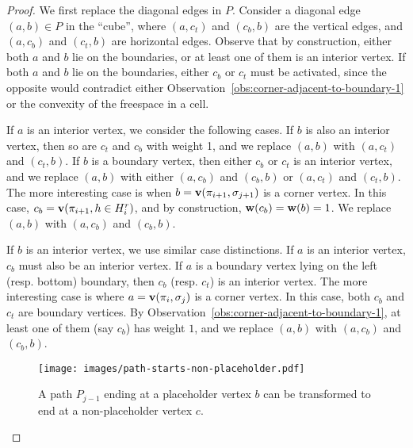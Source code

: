 \documentclass[thm-restate]{lipics-v2021}
\theoremstyle{remark}
\newcommand{\weight}[1]{\normalfont \textbf{w}(#1)}
\newcommand{\doublequote}[1]{``#1''}
\newcommand{\vertex}[1]{\normalfont \textbf{v}(#1)}
\begin{document}
\begin{proof}
    We first replace the diagonal edges in $P$. Consider a diagonal edge $(a, b) \in P$ in the \doublequote{cube}, where $(a, c_t)$ and $(c_b, b)$ are the vertical edges, and $(a, c_b)$ and $(c_t, b)$ are horizontal edges. Observe that by construction, either both $a$ and $b$ lie on the boundaries, or at least one of them is an interior vertex. If both $a$ and $b$ lie on the boundaries, either $c_b$ or $c_t$ must be activated, since the opposite would contradict either Observation~\ref{obs:corner-adjacent-to-boundary-1} or the convexity of the freespace in a cell. 
    
    If $a$ is an interior vertex, we consider the following cases. If $b$ is also an interior vertex, then so are $c_t$ and $c_b$ with weight 1, and we replace $(a, b)$ with $(a, c_t)$ and $(c_t, b)$. If $b$ is a boundary vertex, then either $c_b$ or $c_t$ is an interior vertex, and we replace $(a, b)$ with either $(a, c_b)$ and $(c_b, b)$ or $(a, c_t)$ and $(c_t, b)$. The more interesting case is when $b = \vertex{\pi_{i + 1}, \sigma_{j + 1}}$ is a corner vertex. In this case, $c_b = \vertex{\pi_{i + 1}, h \in H^r_i}$, and by construction, $\weight{c_b} = \weight{b} = 1$. We replace $(a, b)$ with $(a, c_b)$ and $(c_b, b)$. 

    If $b$ is an interior vertex, we use similar case distinctions. If $a$ is an interior vertex, $c_b$ must also be an interior vertex. If $a$ is a boundary vertex lying on the left (resp. bottom) boundary, then $c_b$ (resp. $c_t$) is an interior vertex. The more interesting case is where $a = \vertex{\pi_i, \sigma_j}$ is a corner vertex. In this case, both $c_b$ and $c_t$ are boundary vertices. By Observation~\ref{obs:corner-adjacent-to-boundary-1}, at least one of them (say $c_b$) has weight $1$, and we replace $(a, b)$ with $(a, c_b)$ and $(c_b, b)$. 

    \begin{figure}[tbh]
        \centering
        \texttt{[image: images/path-starts-non-placeholder.pdf]}
        \caption{A path $P_{j - 1}$ ending at a placeholder vertex $b$ can be transformed to end at a non-placeholder vertex $c$.}
        \label{fig:path-starts-non-placeholder}
    \end{figure}


\end{proof}
\end{document}
